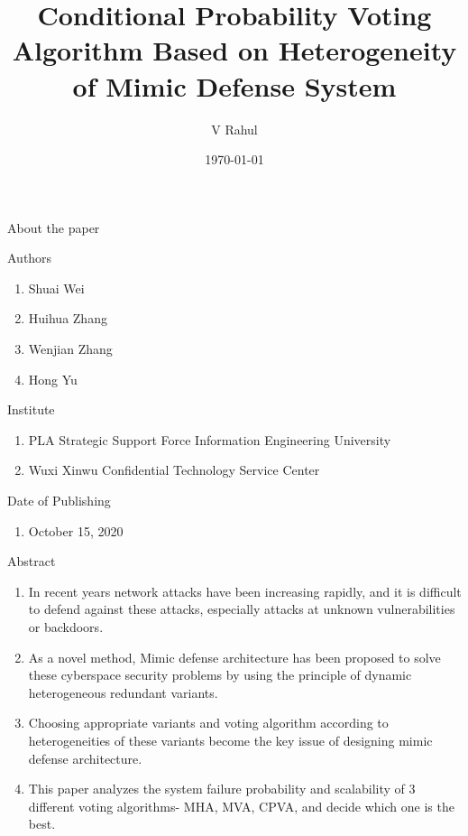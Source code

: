 \documentclass{beamer}
\title{Conditional Probability Voting Algorithm Based on Heterogeneity of Mimic Defense System}
\author{V Rahul}
\institute{IITH}
\date{\today}
\begin{document}
\begin{frame}
  \titlepage
\end{frame}
\begin{frame}{About the paper}
    \begin{block}{Authors}
        \begin{enumerate}[]
            \item Shuai Wei
            \item Huihua Zhang
            \item Wenjian Zhang
            \item Hong Yu
        \end{enumerate}
    \end{block}
    \begin{block}{Institute}
        \begin{enumerate}[]
            \item PLA Strategic Support Force Information Engineering University
            \item Wuxi Xinwu Confidential Technology Service Center
        \end{enumerate}
    \end{block}
    \begin{block}{Date of Publishing}
        \begin{enumerate}[]
            \item October 15, 2020
        \end{enumerate}
    \end{block}
\end{frame}
\begin{frame}{Abstract}
    \begin{block}{}
        \begin{enumerate}
            \item In recent years network attacks have been increasing rapidly, and it is difficult to defend against these attacks, especially attacks at unknown vulnerabilities or backdoors.
            \item As a novel method, Mimic defense architecture has been proposed to solve these cyberspace security problems by using the principle of dynamic heterogeneous redundant variants.
            \item Choosing appropriate variants and voting algorithm according to heterogeneities of these variants become the key issue of designing mimic defense architecture. 
            \item This paper analyzes the system failure probability and scalability of 3 different voting algorithms- MHA, MVA, CPVA, and decide which one is the best.
        \end{enumerate}
    \end{block}
\end{frame}
\end{document}
